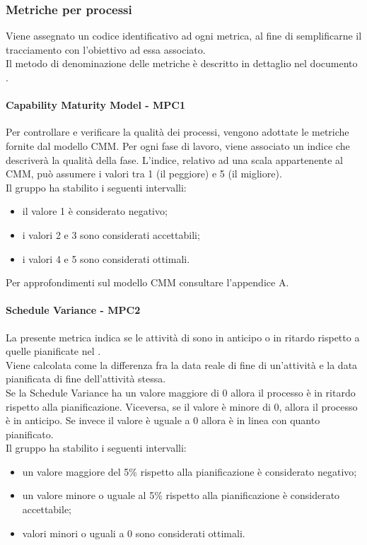\documentclass[PianoDiQualifica.tex]{subfiles}
\begin{document}
		\subsubsection{Metriche per processi}
		Viene assegnato un codice identificativo ad ogni metrica, al fine di semplificarne il tracciamento con l'obiettivo ad essa associato. \\
		Il metodo di denominazione delle metriche è descritto in dettaglio nel documento \NPdocRR{}.
		
			\hypertarget{CMM_m}{\paragraph{Capability Maturity Model - MPC1}}
			Per controllare e verificare la qualità dei processi, vengono adottate le metriche fornite dal modello CMM.
			Per ogni fase di lavoro, viene associato un indice che descriverà la qualità della fase.
			L'indice, relativo ad una scala appartenente al CMM, può assumere i valori tra 1 (il peggiore) e 5 (il migliore). \\
			Il gruppo ha stabilito i seguenti intervalli:
			\begin{itemize}
				\item il valore 1 è considerato negativo;
				\item i valori 2 e 3 sono considerati accettabili;
				\item i valori 4 e 5 sono considerati ottimali.
			\end{itemize}
			Per approfondimenti sul modello CMM consultare l'appendice A.
			
			\hypertarget{Schedule_m}{\paragraph{Schedule Variance - MPC2}}
			La presente metrica indica se le attività di  sono in anticipo o in ritardo rispetto a quelle pianificate nel \PPdocRR{}. \\
			Viene calcolata come la differenza fra la data reale di fine di un’attività e la data pianificata di fine dell’attività stessa. \\
			Se la Schedule Variance ha un valore maggiore di 0 allora il processo è in ritardo rispetto alla pianificazione. Viceversa, se il valore è minore di 0, allora il processo è
			in anticipo. Se invece il valore è uguale a 0 allora è in linea con quanto pianificato. \\
			Il gruppo ha stabilito i seguenti intervalli:
			\begin{itemize}
				\item un valore maggiore del 5\% rispetto alla pianificazione è considerato negativo;
				\item un valore minore o uguale al 5\% rispetto alla pianificazione è considerato accettabile;
				\item valori minori o uguali a 0 sono considerati ottimali.
			\end{itemize}
			
\end{document}
